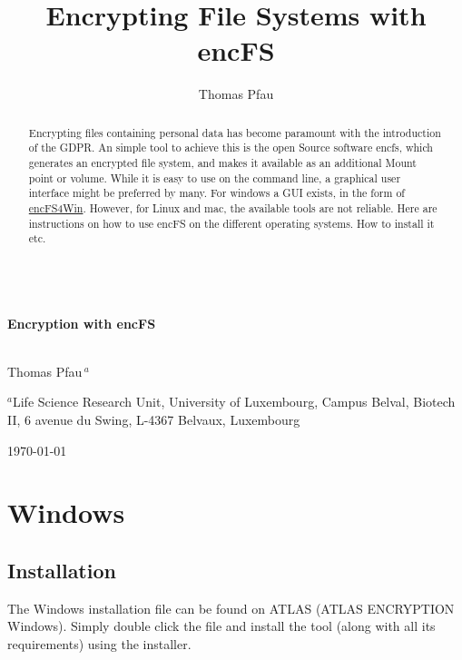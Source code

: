 \documentclass[a4paper,10pt]{report}
\author[1,2]{Thomas Pfau}
\affil[1]{Life Sciences Research Unit, University of Luxembourg}
\title{Encrypting File Systems with encFS}
\begin{document}
\begin{titlepage} \begin{center} 
~\\[0.4cm] { \huge \bfseries Encryption with encFS \\[0.4cm] } ~\\[1.5cm] 
\begin{center} 

\large {Thomas Pfau\,$^{a}$}
\end{center} 
\begin{center} 
$^{a}$Life Science Research Unit, University of Luxembourg, Campus Belval, Biotech II, 6 avenue du Swing, L-4367 Belvaux, Luxembourg\\
\end{center}
\vfill %
{\large \today} 
\end{center} 
\end{titlepage}

\begin{abstract}
Encrypting files containing personal data has become paramount with the introduction of the GDPR.
An simple tool to achieve this is the open Source software encfs, which generates an encrypted file system, and makes it available as an additional Mount point or volume.
While it is easy to use on the command line, a graphical user interface might be preferred by many. 
For windows a GUI exists, in the form of \href{https://github.com/jetwhiz/encfs4win}{encFS4Win}.
However, for Linux and mac, the available tools are not reliable.
Here are instructions on how to use encFS on the different operating systems. How to install it etc. 
\end{abstract}


\section{Windows}
\subsection{Installation}
The Windows installation file can be found on ATLAS (ATLAS \textrightarrow ENCRYPTION \textrightarrow Windows).\newline
Simply double click the file and install the tool (along with all its requirements) using the installer.
\end{document}
